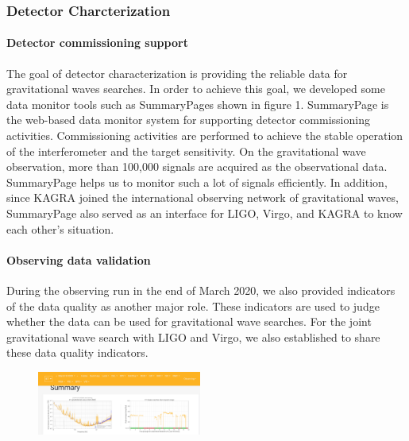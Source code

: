 \vspace{10pt}
\subsubsection*{\bf Detector Charcterization}
\vspace{3pt}

\vspace{3pt}

\paragraph*{\bi Detector commissioning support}
The goal of detector characterization is providing the reliable data for gravitational waves searches.
In order to achieve this goal, we developed some data monitor tools such as SummaryPages shown in figure 1.
SummaryPage is the web-based data monitor system for supporting detector commissioning activities.
Commissioning activities are performed to achieve the stable operation of the interferometer and the target sensitivity. On the gravitational wave observation, more than 100,000 signals are acquired as the observational data.
SummaryPage helps us to monitor such a lot of signals efficiently.
In addition, since KAGRA joined the international observing network of gravitational waves, SummaryPage also served as an interface for LIGO, Virgo, and KAGRA to know each other's situation.

\paragraph*{\bi Observing data validation}
During the observing run in the end of March 2020, we also provided indicators of the data quality as another major role. 
These indicators are used to judge whether the data can be used for gravitational wave searches.  
For the joint gravitational wave search with LIGO and Virgo, we also established to share these data quality indicators. 

\begin{figure}
\begin{center}
\includegraphics[width=0.48\textwidth]{astrodiv/gw/detc/png/det_summary.png}
\end{center}
\end{figure}
